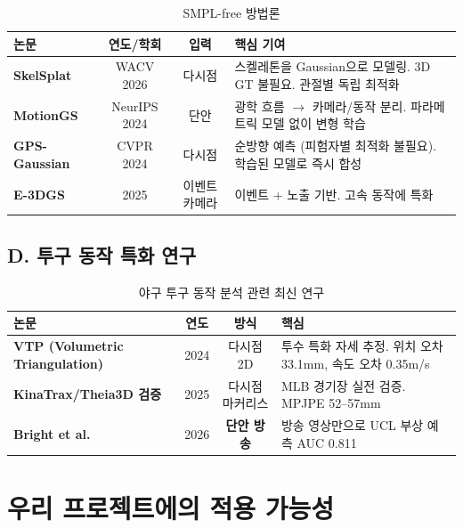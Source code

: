 \documentclass[11pt, a4paper]{report}
\begin{document}
\begin{table}[H]
\centering
\caption{SMPL-free 방법론}
\renewcommand{\arraystretch}{1.2}
\scriptsize
\begin{tabularx}{\textwidth}{lccX}
\toprule
\textbf{논문} & \textbf{연도/학회} & \textbf{입력} & \textbf{핵심 기여} \\
\midrule
\textbf{SkelSplat} & WACV 2026 & 다시점 & 스켈레톤을 Gaussian으로 모델링. 3D GT 불필요. 관절별 독립 최적화 \\
\textbf{MotionGS} & NeurIPS 2024 & 단안 & 광학 흐름 $\rightarrow$ 카메라/동작 분리. 파라메트릭 모델 없이 변형 학습 \\
\textbf{GPS-Gaussian} & CVPR 2024 & 다시점 & 순방향 예측 (피험자별 최적화 불필요). 학습된 모델로 즉시 합성 \\
\textbf{E-3DGS} & 2025 & 이벤트 카메라 & 이벤트 + 노출 기반. 고속 동작에 특화 \\
\bottomrule
\end{tabularx}
\end{table}


\section{D. 투구 동작 특화 연구}

\begin{table}[H]
\centering
\caption{야구 투구 동작 분석 관련 최신 연구}
\renewcommand{\arraystretch}{1.2}
\scriptsize
\begin{tabularx}{\textwidth}{lccX}
\toprule
\textbf{논문} & \textbf{연도} & \textbf{방식} & \textbf{핵심} \\
\midrule
\textbf{VTP (Volumetric Triangulation)} & 2024 & 다시점 2D & 투수 특화 자세 추정. 위치 오차 33.1mm, 속도 오차 0.35m/s \\
\textbf{KinaTrax/Theia3D 검증} & 2025 & 다시점 마커리스 & MLB 경기장 실전 검증. MPJPE 52--57mm \\
\textbf{Bright et al.} & 2026 & \textbf{단안 방송} & 방송 영상만으로 UCL 부상 예측 AUC 0.811 \\
\bottomrule
\end{tabularx}
\end{table}


\chapter{우리 프로젝트에의 적용 가능성}
\end{document}
